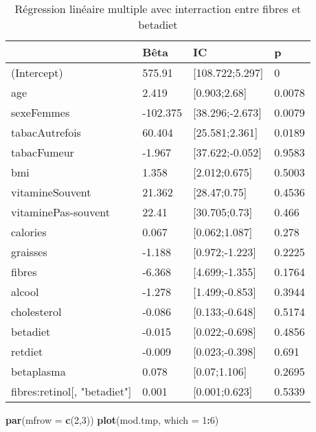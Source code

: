 \documentclass[]{article}
\newenvironment{Shaded}{\begin{snugshade}}{\end{snugshade}}
\newcommand{\KeywordTok}[1]{\textcolor[rgb]{0.13,0.29,0.53}{\textbf{#1}}}
\newcommand{\DataTypeTok}[1]{\textcolor[rgb]{0.13,0.29,0.53}{#1}}
\newcommand{\DecValTok}[1]{\textcolor[rgb]{0.00,0.00,0.81}{#1}}
\newcommand{\OperatorTok}[1]{\textcolor[rgb]{0.81,0.36,0.00}{\textbf{#1}}}
\newcommand{\NormalTok}[1]{#1}
\begin{document}
\begin{table}

\caption{\label{tab:unnamed-chunk-76}Régression linéaire multiple avec interraction entre fibres et betadiet}
\centering
\begin{tabular}[t]{l|l|l|l}
\hline
  & Bêta & IC & p\\
\hline
\rowcolor[HTML]{BBD2E1}  (Intercept) & 575.91 & [108.722;5.297] & 0\\
\hline
age & 2.419 & [0.903;2.68] & 0.0078\\
\hline
\rowcolor[HTML]{BBD2E1}  sexeFemmes & -102.375 & [38.296;-2.673] & 0.0079\\
\hline
tabacAutrefois & 60.404 & [25.581;2.361] & 0.0189\\
\hline
\rowcolor[HTML]{BBD2E1}  tabacFumeur & -1.967 & [37.622;-0.052] & 0.9583\\
\hline
bmi & 1.358 & [2.012;0.675] & 0.5003\\
\hline
\rowcolor[HTML]{BBD2E1}  vitamineSouvent & 21.362 & [28.47;0.75] & 0.4536\\
\hline
vitaminePas-souvent & 22.41 & [30.705;0.73] & 0.466\\
\hline
\rowcolor[HTML]{BBD2E1}  calories & 0.067 & [0.062;1.087] & 0.278\\
\hline
graisses & -1.188 & [0.972;-1.223] & 0.2225\\
\hline
\rowcolor[HTML]{BBD2E1}  fibres & -6.368 & [4.699;-1.355] & 0.1764\\
\hline
alcool & -1.278 & [1.499;-0.853] & 0.3944\\
\hline
\rowcolor[HTML]{BBD2E1}  cholesterol & -0.086 & [0.133;-0.648] & 0.5174\\
\hline
betadiet & -0.015 & [0.022;-0.698] & 0.4856\\
\hline
\rowcolor[HTML]{BBD2E1}  retdiet & -0.009 & [0.023;-0.398] & 0.691\\
\hline
betaplasma & 0.078 & [0.07;1.106] & 0.2695\\
\hline
\rowcolor[HTML]{BBD2E1}  fibres:retinol[, "betadiet"] & 0.001 & [0.001;0.623] & 0.5339\\
\hline
\end{tabular}
\end{table}

\begin{Shaded}
\begin{Highlighting}[]
\KeywordTok{par}\NormalTok{(}\DataTypeTok{mfrow =} \KeywordTok{c}\NormalTok{(}\DecValTok{2}\NormalTok{,}\DecValTok{3}\NormalTok{))}
\KeywordTok{plot}\NormalTok{(mod.tmp, }\DataTypeTok{which =} \DecValTok{1}\OperatorTok{:}\DecValTok{6}\NormalTok{)}
\end{Highlighting}
\end{Shaded}
\end{document}
